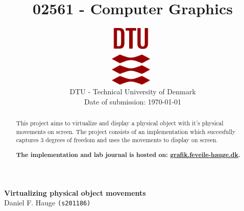 \documentclass[a4paper]{article}
\begin{document}
\title{02561 - Computer Graphics}
\author{
\includegraphics[width=0.15\textwidth]{images/dtu.eps}~\\[1cm]
    DTU - Technical University of Denmark
    \\[0.5cm]
    Date of submission: \today
    \\
}
\date{} %
\color{black}
\maketitle
\begin{center}
{ \huge \bfseries Virtualizing physical object movements}\\

\vspace{.25cm}
Daniel F. Hauge \texttt{(s201186)}\\


\vspace{.25cm}
\end{center}

\begin{abstract}
This project aims to virtualize and display a physical object with it's physical movements on screen. 
The project consists of an implementation which succesfully captures 3 degrees of freedom and uses the movements to display on screen.
\\
{ \begin{center} \bfseries The implementation and lab journal is hosted on: \href{https://grafik.feveile-hauge.dk}{grafik.feveile-hauge.dk}. \end{center}}
\end{abstract}

\medskip
\newpage


\end{document}
